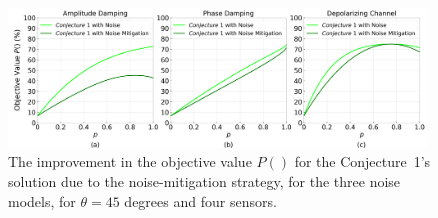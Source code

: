 \begin{figure}[b]
    \centering
    \includegraphics[width=0.99\textwidth]{chapters/tqc/figures/povmnoise.png}
    \caption{The improvement in the objective value $P()$ for the Conjecture~1's solution due to the noise-mitigation strategy, for the three noise models, for $\theta=45$ degrees and four sensors.}
    \label{fig:povm_noise}
\end{figure}


